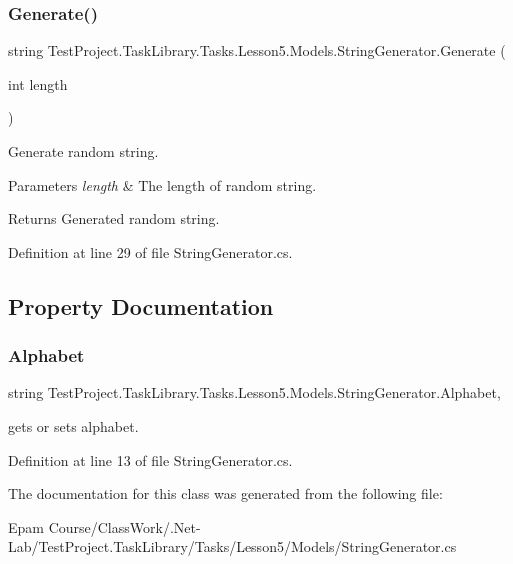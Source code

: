 \subsubsection{\texorpdfstring{Generate()}{Generate()}}
{\footnotesize\ttfamily string Test\+Project.\+Task\+Library.\+Tasks.\+Lesson5.\+Models.\+String\+Generator.\+Generate (\begin{DoxyParamCaption}\item[{int}]{length }\end{DoxyParamCaption})}



Generate random string. 


\begin{DoxyParams}{Parameters}
{\em length} & The length of random string.\\
\hline
\end{DoxyParams}
\begin{DoxyReturn}{Returns}
Generated random string.
\end{DoxyReturn}


Definition at line 29 of file String\+Generator.\+cs.



\subsection{Property Documentation}
\mbox{\label{class_test_project_1_1_task_library_1_1_tasks_1_1_lesson5_1_1_models_1_1_string_generator_a5eaa63aacbe572ec3db3a3afc80933a9}} 
\subsubsection{\texorpdfstring{Alphabet}{Alphabet}}
{\footnotesize\ttfamily string Test\+Project.\+Task\+Library.\+Tasks.\+Lesson5.\+Models.\+String\+Generator.\+Alphabet\hspace{0.3cm}{\ttfamily [get]}, {\ttfamily [set]}}



gets or sets alphabet. 



Definition at line 13 of file String\+Generator.\+cs.



The documentation for this class was generated from the following file\+:\begin{DoxyCompactItemize}
\item 
Epam Course/\+Class\+Work/.\+Net-\/\+Lab/\+Test\+Project.\+Task\+Library/\+Tasks/\+Lesson5/\+Models/String\+Generator.\+cs\end{DoxyCompactItemize}

